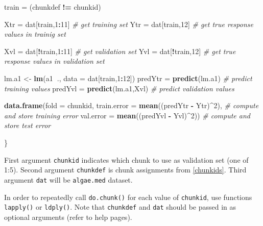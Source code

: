 \documentclass[]{article}
\newenvironment{Shaded}{\begin{snugshade}}{\end{snugshade}}
\newcommand{\KeywordTok}[1]{\textcolor[rgb]{0.13,0.29,0.53}{\textbf{#1}}}
\newcommand{\DataTypeTok}[1]{\textcolor[rgb]{0.13,0.29,0.53}{#1}}
\newcommand{\DecValTok}[1]{\textcolor[rgb]{0.00,0.00,0.81}{#1}}
\newcommand{\StringTok}[1]{\textcolor[rgb]{0.31,0.60,0.02}{#1}}
\newcommand{\CommentTok}[1]{\textcolor[rgb]{0.56,0.35,0.01}{\textit{#1}}}
\newcommand{\OperatorTok}[1]{\textcolor[rgb]{0.81,0.36,0.00}{\textbf{#1}}}
\newcommand{\NormalTok}[1]{#1}
\begin{document}
\begin{enumerate}
\begin{enumerate}
\begin{Shaded}
\begin{Highlighting}[]
\NormalTok{    train =}\StringTok{ }\NormalTok{(chunkdef }\OperatorTok{!=}\StringTok{ }\NormalTok{chunkid)}

\NormalTok{    Xtr =}\StringTok{ }\NormalTok{dat[train,}\DecValTok{1}\OperatorTok{:}\DecValTok{11}\NormalTok{]  }\CommentTok{# get training set}
\NormalTok{    Ytr =}\StringTok{ }\NormalTok{dat[train,}\DecValTok{12}\NormalTok{]  }\CommentTok{# get true response values in trainig set}

\NormalTok{    Xvl =}\StringTok{ }\NormalTok{dat[}\OperatorTok{!}\NormalTok{train,}\DecValTok{1}\OperatorTok{:}\DecValTok{11}\NormalTok{]  }\CommentTok{# get validation set}
\NormalTok{    Yvl =}\StringTok{ }\NormalTok{dat[}\OperatorTok{!}\NormalTok{train,}\DecValTok{12}\NormalTok{]  }\CommentTok{# get true response values in validation set}

\NormalTok{    lm.a1 <-}\StringTok{ }\KeywordTok{lm}\NormalTok{(a1}\OperatorTok{~}\NormalTok{., }\DataTypeTok{data =}\NormalTok{ dat[train,}\DecValTok{1}\OperatorTok{:}\DecValTok{12}\NormalTok{])}
\NormalTok{    predYtr =}\StringTok{ }\KeywordTok{predict}\NormalTok{(lm.a1)  }\CommentTok{# predict training values}
\NormalTok{    predYvl =}\StringTok{ }\KeywordTok{predict}\NormalTok{(lm.a1,Xvl)  }\CommentTok{# predict validation values}

    \KeywordTok{data.frame}\NormalTok{(}\DataTypeTok{fold =}\NormalTok{ chunkid,}
               \DataTypeTok{train.error =} \KeywordTok{mean}\NormalTok{((predYtr }\OperatorTok{-}\StringTok{ }\NormalTok{Ytr)}\OperatorTok{^}\DecValTok{2}\NormalTok{), }\CommentTok{# compute and store training error}
               \DataTypeTok{val.error =} \KeywordTok{mean}\NormalTok{((predYvl }\OperatorTok{-}\StringTok{ }\NormalTok{Yvl)}\OperatorTok{^}\DecValTok{2}\NormalTok{))   }\CommentTok{# compute and store test error}

\NormalTok{\}}
\end{Highlighting}
\end{Shaded}

    First argument \texttt{chunkid} indicates which chunk to use as
    validation set (one of 1:5). Second argument \texttt{chunkdef} is
    chunk assignments from \eqref{chunkids}. Third argument \texttt{dat}
    will be \texttt{algae.med} dataset.

    In order to repeatedly call \texttt{do.chunk()} for each value of
    \texttt{chunkid}, use functions \texttt{lapply()} or
    \texttt{ldply()}. Note that \texttt{chunkdef} and \texttt{dat}
    should be passed in as optional arguments (refer to help pages).


\end{enumerate}
\end{enumerate}
\end{document}
